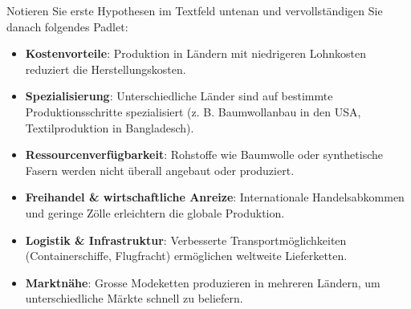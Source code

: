 \begin{myexercise}\label{ex:globaleLieferketten}

Notieren Sie erste Hypothesen im Textfeld untenan und vervollständigen Sie danach folgendes Padlet: 



\begin{myanswer}
\begin{itemize}
\item \textbf{Kostenvorteile}: Produktion in Ländern mit niedrigeren Lohnkosten reduziert die Herstellungskosten.
\item \textbf{Spezialisierung}: Unterschiedliche Länder sind auf bestimmte Produktionsschritte spezialisiert (z. B. Baumwollanbau in den USA, Textilproduktion in Bangladesch).
\item \textbf{Ressourcenverfügbarkeit}: Rohstoffe wie Baumwolle oder synthetische Fasern werden nicht überall angebaut oder produziert.
\item \textbf{Freihandel \& wirtschaftliche Anreize}: Internationale Handelsabkommen und geringe Zölle erleichtern die globale Produktion.
\item \textbf{Logistik \& Infrastruktur}: Verbesserte Transportmöglichkeiten (Containerschiffe, Flugfracht) ermöglichen weltweite Lieferketten.
\item \textbf{Marktnähe}: Grosse Modeketten produzieren in mehreren Ländern, um unterschiedliche Märkte schnell zu beliefern.
\end{itemize}
\end{myanswer}

\end{myexercise}

